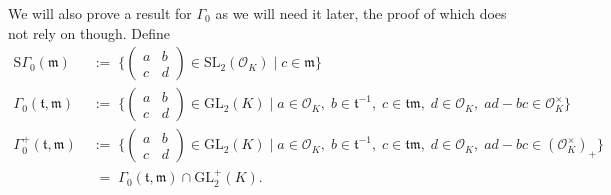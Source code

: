 \documentclass[11pt]{amsart}
\theoremstyle{remark}
\newcommand\m[1]{\begin{pmatrix}#1\end{pmatrix}}
\newcommand\fr[1]{\mathfrak{#1}}
\newcommand{\clo}{\mathcal{O}}
\newcommand{\eq}{\;=\;}
\newcommand{\deq}{\;:=\;}
\newcommand{\GL}{\mathrm{GL}}
\newcommand{\SL}{\mathrm{SL}}
\newcommand{\SG}{\mathrm{S}\Gamma}
\begin{document}
We will also prove a result for $\Gamma_0$ as we will need it later, the proof of which does not rely on  though. Define
\begin{align*}
    \SG_0(\fr{m})&\deq\bigg\{\m{a&b\\c&d}\in\SL_2(\clo_K)\;\bigg|\; c\in\fr{m}\bigg\} \\
    \Gamma_0(\fr{t},\fr{m})&\deq\bigg\{\m{a&b\\c&d}\in\GL_2(K)\;\bigg|\; a\in\clo_K,\;b\in\fr{t}^{-1},\;c\in\fr{t}\fr{m},\;d\in\clo_K,\;ad-bc\in\clo_K^\times\bigg\} \\
    \Gamma_0^+(\fr{t},\fr{m})&\deq\bigg\{\m{a&b\\c&d}\in\GL_2(K)\;\bigg|\; a\in\clo_K,\;b\in\fr{t}^{-1},\;c\in\fr{t}\fr{m},\;d\in\clo_K,\;ad-bc\in(\clo_K^\times)_+\bigg\}\\
    &\;\eq\Gamma_0(\fr{t},\fr{m})\cap\GL_2^+(K).
\end{align*}
\end{document}
